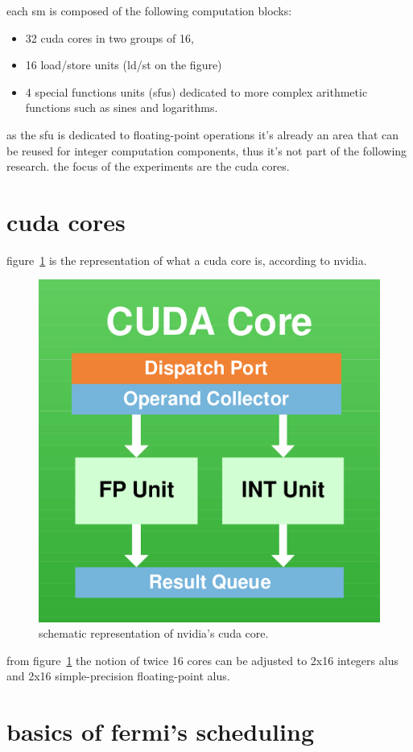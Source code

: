 \documentclass{report}
\begin{document}
    each sm is composed of the following computation blocks\cite{fermiwhitepap}:
    \begin{itemize}
        \item 32 cuda cores in two groups of 16,
        \item 16 load/store units (ld/st on the figure)
        \item 4 special functions units (sfus) dedicated to more complex
              arithmetic functions such as sines and logarithms.
    \end{itemize}
    
    as the sfu is dedicated to floating-point operations it's already an area
    that can be reused for integer computation components, thus it's not part
    of the following research. the focus of the experiments are the cuda cores.

    \section{cuda cores}
    figure~\ref{fig:cudacore} is the representation of what a cuda core is,
    according to nvidia\cite{fermiwhitepap}.
    
    \begin{figure}[h]
    \centering
        \includegraphics[width=0.5\linewidth]{pictures/cudacore}
        \captionsetup{justification=centering}
        \caption{schematic representation of nvidia's cuda core.}
        \label{fig:cudacore}
    \end{figure}
    
    from figure~\ref{fig:cudacore} the notion of twice 16 cores can be
    adjusted to 2x16 integers alus and 2x16 simple-precision floating-point
    alus.

    \section{basics of fermi's scheduling}
\end{document}
